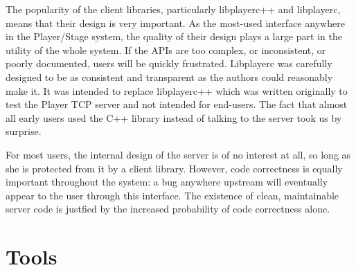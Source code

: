
The popularity of the client libraries, particularly libplayerc++ and
libplayerc, means that their design is very important. As the
most-used interface anywhere in the Player/Stage system, the quality
of their design plays a large part in the utility of the whole
system. If the APIs are too complex, or inconsistent, or poorly
documented, users will be quickly frustrated. Libplayerc was carefully
designed to be as consistent and transparent as the authors could
reasonably make it. It was intended to replace libplayerc++ which was
written originally to test the Player TCP server and not intended for
end-users. The fact that almost all early users used the C++ library
instead of talking to the server took us by surprise.

For most users, the internal design of the server is of no interest at
all, so long as she is protected from it by a client library. However,
code correctness is equally important throughout the system: a bug
anywhere upstream will eventually appear to the user through this
interface. The existence of clean, maintainable server code is
justfied by the increased probability of code correctness alone. 

\section{Tools}

